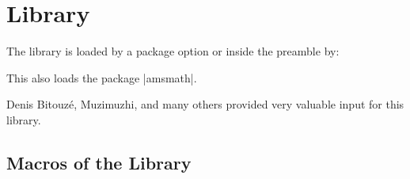 \clearpage
\section{Library }\label{sec:theorems}%
%
The library is loaded by a package option or inside the preamble by:
\begin{dispListing}
\end{dispListing}
This also loads the package |amsmath|.

Denis Bitouz\'e, Muzimuzhi, and many others provided very valuable input for this library.


\subsection{Macros of the Library}


